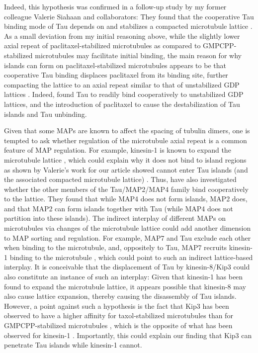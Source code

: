 Indeed, this hypothesis was confirmed in a follow-up study by my former colleague Valerie Siahaan and collaborators: They found that the cooperative Tau binding mode of Tau depends on and stabilizes a compacted microtubule lattice \parencite{siahaan2022microtubule}. As a small deviation from my initial reasoning above, while the slightly lower axial repeat of paclitaxel-stabilized microtubules as compared to GMPCPP-stabilized microtubules may facilitate initial binding, the main reason for why islands can form on paclitaxel-stabilized microtubules appears to be that cooperative Tau binding displaces paclitaxel from its binding site, further compacting the lattice to an axial repeat similar to that of unstabilized GDP lattices \parencite{siahaan2022microtubule}. Indeed, \cite{siahaan2022microtubule} found Tau to readily bind cooperatively to unstabilized GDP lattices, and the introduction of paclitaxel to cause the destabilization of Tau islands and Tau unbinding.\par

Given that some MAPs are known to affect the spacing of tubulin dimers, one is tempted to ask whether regulation of the microtubule axial repeat is a common feature of MAP regulation. For example, kinesin-1 is known to expand the microtubule lattice , which could explain why it does not bind to island regions as shown by Valerie's work for our article showed cannot enter Tau islands (and the associated compacted microtubule lattice) . Thus, \cite{siahaan2022microtubule} have also investigated whether the other members of the Tau/MAP2/MAP4 family bind cooperatively to the lattice. They found that while MAP4 does not form islands, MAP2 does, and that MAP2 can form islands together with Tau (while MAP4 does not partition into these islands). The indirect interplay of different MAPs on microtubules via changes of the microtubule lattice could add another dimension to MAP sorting and regulation. For example, MAP7 and Tau exclude each other when binding to the microtubule, and, oppositely to Tau, MAP7 recruits kinesin-1 binding to the microtubule \cite{Monroy2018}, which could point to such an indirect lattice-based interplay. It is conceivable that the displacement of Tau by kinesin-8/Kip3 could also constitute an instance of such an interplay: Given that kinesin-1 has been found to expand the microtubule lattice, it appears possible that kinesin-8 may also cause lattice expansion, thereby causing the disassembly of Tau islands. However, a point against such a hypothesis is the fact that Kip3 has been observed to have a higher affinity for taxol-stabilized microtubules than for GMPCPP-stabilized microtubules , which is the opposite of what has been observed for kinesin-1 . Importantly, this could explain our finding that Kip3 can penetrate Tau islands while kinesin-1 cannot.\par

